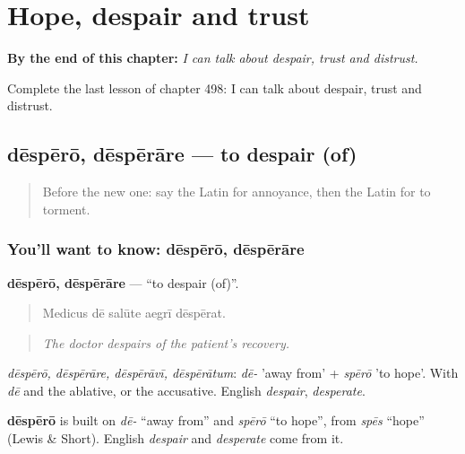 
\chapter{Hope, despair and trust}
\label{ch:la-hope-despair-and-trust}

\begin{chapteropening}
\textbf{By the end of this chapter:} \emph{I can talk about despair, trust and distrust.}

Complete the last lesson of chapter 498: I can talk about despair, trust and distrust.
\end{chapteropening}

\section[dēspērō, dēspērāre]{dēspērō, dēspērāre — to despair (of)}

\label{lesson:LA-C498-despero}



\begin{quote}
Before the new one: say the Latin for annoyance, then the Latin for to torment.
\end{quote}

\subsection*{You'll want to know: dēspērō, dēspērāre}
\textbf{dēspērō, dēspērāre} — \textquotedblleft{}to despair (of)\textquotedblright{}.

\begin{quote}
Medicus dē salūte aegrī dēspērat.
\end{quote}

\begin{quote}
\emph{The doctor despairs of the patient's recovery.}
\end{quote}

\emph{dēspērō, dēspērāre, dēspērāvī, dēspērātum}: \emph{dē-} 'away from' + \emph{spērō} 'to hope'. With \emph{dē} and the ablative, or the accusative. English \emph{despair}, \emph{desperate}.

\begin{cousinweb}
\textbf{dēspērō} is built on \emph{dē-} \textquotedblleft{}away from\textquotedblright{} and \emph{spērō} \textquotedblleft{}to hope\textquotedblright{}, from \emph{spēs} \textquotedblleft{}hope\textquotedblright{} (Lewis \& Short). English \emph{despair} and \emph{desperate} come from it.
\end{cousinweb}

